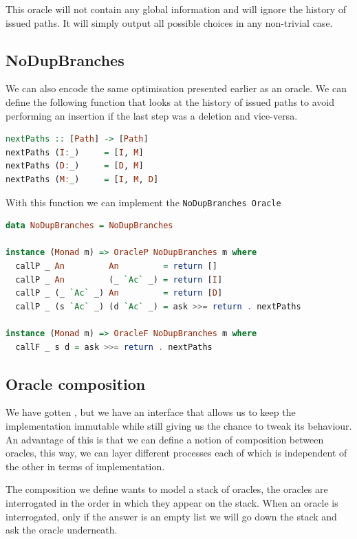 \documentclass[11pt]{article}
\begin{document}
This oracle will not contain any global information and will ignore the history 
of issued paths. It will simply output all possible choices in any non-trivial 
case.

\subsection{NoDupBranches}
We can also encode the same optimisation presented earlier as an oracle. We can 
define the following function that looks at the history of issued paths to avoid 
performing an insertion if the last step was a deletion and vice-versa.

\begin{lstlisting}[language=haskell]
nextPaths :: [Path] -> [Path]
nextPaths (I:_)     = [I, M]
nextPaths (D:_)     = [D, M]
nextPaths (M:_)     = [I, M, D]
\end{lstlisting}

With this function we can implement the \texttt{NoDupBranches Oracle}

\begin{lstlisting}[language=haskell]
data NoDupBranches = NoDupBranches

instance (Monad m) => OracleP NoDupBranches m where
  callP _ An         An         = return []
  callP _ An         (_ `Ac` _) = return [I]
  callP _ (_ `Ac` _) An         = return [D]
  callP _ (s `Ac` _) (d `Ac` _) = ask >>= return . nextPaths

instance (Monad m) => OracleF NoDupBranches m where
  callF _ s d = ask >>= return . nextPaths
\end{lstlisting}

\subsection{Oracle composition}

We have gotten , but we have an interface that allows us 
to keep the implementation immutable while still giving us the chance to tweak 
its behaviour. An advantage of this is that we can define a notion of 
composition between oracles, this way, we can layer different processes each of 
which is independent of the other in terms of implementation.

The composition we define wants to model a stack of oracles, the oracles are 
interrogated in the order in which they appear on the stack. When an oracle is 
interrogated, only if the answer is an empty list we will go down the stack and 
ask the oracle underneath. 
\end{document}
